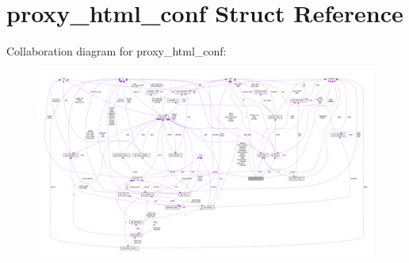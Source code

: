 \hypertarget{structproxy__html__conf}{}\section{proxy\+\_\+html\+\_\+conf Struct Reference}
\label{structproxy__html__conf}


Collaboration diagram for proxy\+\_\+html\+\_\+conf\+:
\nopagebreak
\begin{figure}[H]
\begin{center}
\leavevmode
\includegraphics[width=350pt]{structproxy__html__conf__coll__graph}
\end{center}
\end{figure}
